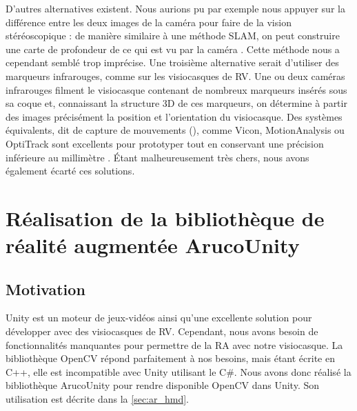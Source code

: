 

D'autres alternatives existent. Nous aurions pu par exemple nous appuyer sur la différence entre les deux images de la caméra pour faire de la vision stéréoscopique : de manière similaire à une méthode SLAM, on peut construire une carte de profondeur de ce qui est vu par la caméra . Cette méthode nous a cependant semblé trop imprécise. Une troisième alternative serait d'utiliser des marqueurs infrarouges, comme sur les visiocasques de RV. Une ou deux caméras infrarouges filment le visiocasque contenant de nombreux marqueurs insérés sous sa coque  et, connaissant la structure 3D de ces marqueurs, on détermine à partir des images précisément la position et l'orientation du visiocasque. Des systèmes équivalents, dit de capture de mouvements (), comme Vicon, MotionAnalysis ou OptiTrack sont excellents pour prototyper tout en conservant une précision inférieure au millimètre . Étant malheureusement très chers, nous avons également écarté ces solutions.


\section{Réalisation de la bibliothèque de réalité augmentée ArucoUnity}
\label{sec:aruco_unity}

\subsection{Motivation}
\label{subsec:aruco_unity_motivation}

Unity est un moteur de jeux-vidéos ainsi qu'une excellente solution pour développer avec des visiocasques de RV. Cependant, nous avons besoin de fonctionnalités manquantes pour permettre de la RA avec notre visiocasque. La bibliothèque OpenCV répond parfaitement à nos besoins, mais étant écrite en C++, elle est incompatible avec Unity utilisant le C\#. Nous avons donc réalisé la bibliothèque ArucoUnity pour rendre disponible OpenCV dans Unity. Son utilisation est décrite dans la \autoref{sec:ar_hmd}.

